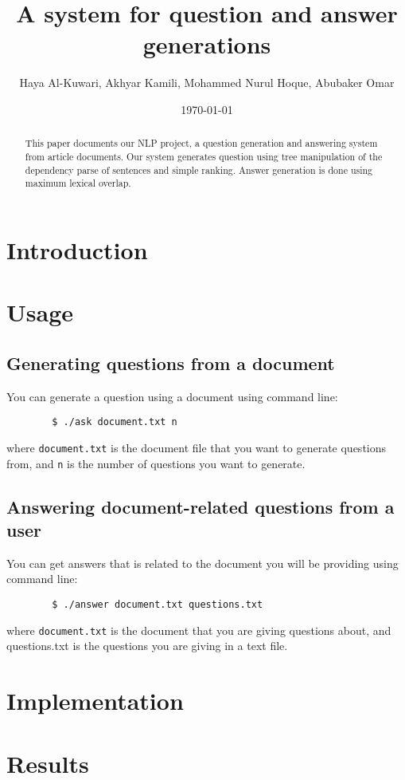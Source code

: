 \documentclass{article}
\title{A system for question and answer generations}
\author{Haya Al-Kuwari, Akhyar Kamili, Mohammed Nurul Hoque, Abubaker Omar}
\date{\today}
\begin{document}
    \maketitle
    \begin{abstract}
        This paper documents our NLP project, a question generation and answering system from
        article documents. Our system generates question using tree manipulation of the dependency
        parse of sentences and simple ranking. Answer generation is done using maximum lexical
        overlap.
    \end{abstract}        
    \section{Introduction}
    \section{Usage}
        \subsection{Generating questions from a document}
        You can generate a question using a document using command line: 
        \begin{verbatim}
        $ ./ask document.txt n 
        \end{verbatim}
        where \texttt{document.txt} is the document file that you want to generate questions from, 
        and \texttt{n} is the number of questions you want to generate.
        \subsection{Answering document-related questions from a user}
        You can get answers that is related to the document you will be providing using command line: 
        \begin{verbatim}
        $ ./answer document.txt questions.txt 
        \end{verbatim}
        where \texttt{document.txt} is the document that you are giving questions about, 
        and {questions.txt} is the questions you are giving in a text file. 
    \section{Implementation}
    \section{Results}
\end{document}

